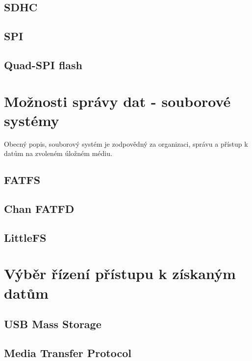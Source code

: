 \subsection{SDHC}

\subsection{SPI}
\subsection{Quad-SPI flash}


\section{Možnosti správy dat - souborové systémy} 
Obecný popis, souborový systém je zodpovědný za organizaci, správu a přístup k datům na zvoleném úložném médiu.

\subsection{FATFS}

\subsection{Chan FATFD}

\subsection{LittleFS}



\section{Výběr řízení přístupu k získaným datům}

\subsection{USB Mass Storage}

\subsection{Media Transfer Protocol}

